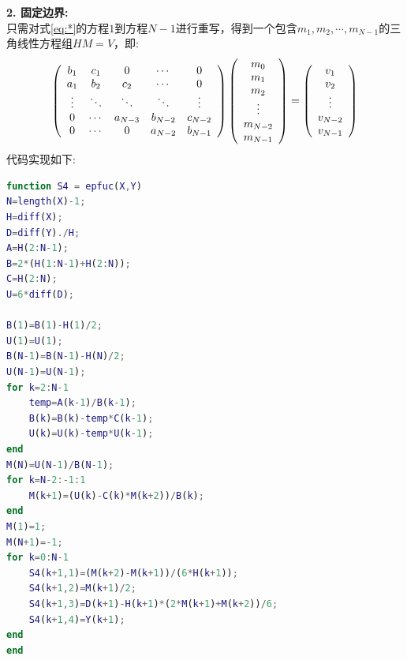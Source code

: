 \documentclass[UTF8]{ctexart}
\begin{document}
\textbf{2. 固定边界:}\\
只需对式\ref{eq:*}的方程$1$到方程$N-1$进行重写，得到一个包含$m_1,m_2,\cdots ,m_{N-1}$的三角线性方程组$HM=V$，即:
\begin{equation}
	\left(
	\begin{array}{ccccc}
		b_{1} & c_{1} & 0 & \cdots & 0 \\
		a_{1} & b_{2} & c_{2} & \cdots & 0\\
		\vdots & \ddots & \ddots & \ddots & \vdots \\
		0 & \cdots & a_{N-3} & b_{N-2} & c_{N-2} \\
		0 & \cdots & 0 & a_{N-2} & b_{N-1} 
	\end{array}
	\right)
	\left(
	\begin{array}{c}
		m_0\\
		m_1\\
		m_2\\
		\vdots \\
		m_{N-2}\\
		m_{N-1}
	\end{array}
	\right)
	=
	\left(
	\begin{array}{c}
		v_1\\
		v_2\\
		\vdots \\
		v_{N-2}\\
		v_{N-1}
	\end{array}
	\right)\notag
\end{equation}
代码实现如下:
\begin{lstlisting}[language=matlab]
function S4 = epfuc(X,Y)
N=length(X)-1;
H=diff(X);
D=diff(Y)./H;
A=H(2:N-1);
B=2*(H(1:N-1)+H(2:N));
C=H(2:N);
U=6*diff(D);

B(1)=B(1)-H(1)/2;
U(1)=U(1);
B(N-1)=B(N-1)-H(N)/2;
U(N-1)=U(N-1);
for k=2:N-1
	temp=A(k-1)/B(k-1);
	B(k)=B(k)-temp*C(k-1);
	U(k)=U(k)-temp*U(k-1);
end
M(N)=U(N-1)/B(N-1);
for k=N-2:-1:1
	M(k+1)=(U(k)-C(k)*M(k+2))/B(k);
end
M(1)=1;
M(N+1)=-1;
for k=0:N-1
	S4(k+1,1)=(M(k+2)-M(k+1))/(6*H(k+1));
	S4(k+1,2)=M(k+1)/2;
	S4(k+1,3)=D(k+1)-H(k+1)*(2*M(k+1)+M(k+2))/6;
	S4(k+1,4)=Y(k+1);
end
end
\end{lstlisting}
\end{document}
